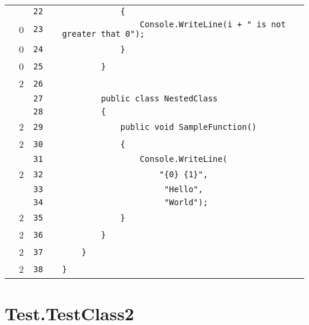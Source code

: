 \documentclass[a4paper,landscape,10pt]{article}
\begin{document}
\begin{longtable}[l]{lrrll}
\cellcolor{gray} &  & \verb~22~ & & \verb~            {~\\
\cellcolor{red} & 0 & \verb~23~ & & \verb~                Console.WriteLine(i + " is not greater that 0");~\\
\cellcolor{red} & 0 & \verb~24~ & & \verb~            }~\\
\cellcolor{red} & 0 & \verb~25~ & & \verb~        }~\\
\cellcolor{green} & 2 & \verb~26~ & & \verb~~\\
\cellcolor{gray} &  & \verb~27~ & & \verb~        public class NestedClass~\\
\cellcolor{gray} &  & \verb~28~ & & \verb~        {~\\
\cellcolor{green} & 2 & \verb~29~ & & \verb~            public void SampleFunction()~\\
\cellcolor{green} & 2 & \verb~30~ & & \verb~            {~\\
\cellcolor{gray} &  & \verb~31~ & & \verb~                Console.WriteLine(~\\
\cellcolor{green} & 2 & \verb~32~ & & \verb~                    "{0} {1}",~\\
\cellcolor{gray} &  & \verb~33~ & & \verb~                     "Hello",~\\
\cellcolor{gray} &  & \verb~34~ & & \verb~                     "World");~\\
\cellcolor{green} & 2 & \verb~35~ & & \verb~            }~\\
\cellcolor{green} & 2 & \verb~36~ & & \verb~        }~\\
\cellcolor{green} & 2 & \verb~37~ & & \verb~    }~\\
\cellcolor{green} & 2 & \verb~38~ & & \verb~}~\\
\end{longtable}
\newpage
\section{Test.TestClass2}
\end{document}
